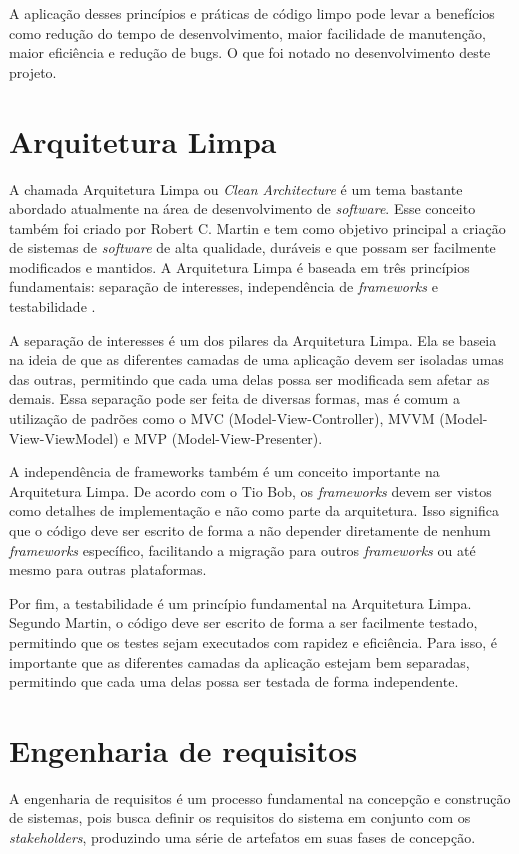 A aplicação desses princípios e práticas de código limpo pode levar a benefícios como redução do tempo de desenvolvimento, maior facilidade de manutenção, maior eficiência e redução de bugs. O que foi notado no desenvolvimento deste projeto.


\section{Arquitetura Limpa}\label{sec:arquitetura_limpa}
A chamada Arquitetura Limpa ou \textit{Clean Architecture} é um tema bastante abordado atualmente na área de desenvolvimento de \textit{software}. Esse conceito também foi criado por Robert C. Martin e tem como objetivo principal a criação de sistemas de \textit{software} de alta qualidade, duráveis e que possam ser facilmente modificados e mantidos. A Arquitetura Limpa é baseada em três princípios fundamentais: separação de interesses, independência de \textit{frameworks} e testabilidade \cite{martin2018arquitetura}.

A separação de interesses é um dos pilares da Arquitetura Limpa. Ela se baseia na ideia de que as diferentes camadas de uma aplicação devem ser isoladas umas das outras, permitindo que cada uma delas possa ser modificada sem afetar as demais. Essa separação pode ser feita de diversas formas, mas é comum a utilização de padrões como o MVC (Model-View-Controller), MVVM (Model-View-ViewModel) e MVP (Model-View-Presenter).

A independência de frameworks também é um conceito importante na Arquitetura Limpa. De acordo com o Tio Bob, os \textit{frameworks} devem ser vistos como detalhes de implementação e não como parte da arquitetura. Isso significa que o código deve ser escrito de forma a não depender diretamente de nenhum \textit{frameworks} específico, facilitando a migração para outros \textit{frameworks} ou até mesmo para outras plataformas.

Por fim, a testabilidade é um princípio fundamental na Arquitetura Limpa. Segundo Martin, o código deve ser escrito de forma a ser facilmente testado, permitindo que os testes sejam executados com rapidez e eficiência. Para isso, é importante que as diferentes camadas da aplicação estejam bem separadas, permitindo que cada uma delas possa ser testada de forma independente.

\section{Engenharia de requisitos}\label{sec:eng_req}
A engenharia de requisitos é um processo fundamental na concepção e construção de sistemas, pois busca definir os requisitos do sistema em conjunto com os \textit{stakeholders}, produzindo uma série de artefatos em suas fases de concepção. 

